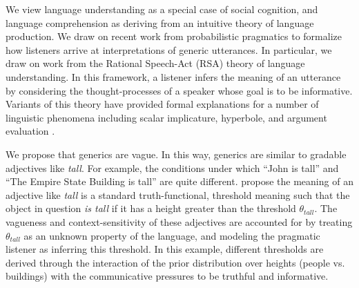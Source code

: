 \documentclass[10pt,letterpaper]{article}
\begin{document}
We view language understanding as a special case of social cognition, and language comprehension as deriving from an intuitive theory of language production.  We draw on recent work from probabilistic pragmatics to formalize how listeners arrive at interpretations of generic utterances. In particular, we draw on work from the Rational Speech-Act (RSA) theory of language understanding. In this framework, a listener infers the meaning of an utterance by considering the thought-processes of a speaker whose goal is to be informative. Variants of this theory have provided formal explanations for a number of linguistic phenomena including scalar implicature, hyperbole, and argument evaluation \cite{Kao2014, Tessler2014, Lassiter2014}. 





We propose that generics are vague. In this way, generics are similar to gradable adjectives like \emph{tall}. For example, the conditions under which ``John is tall'' and ``The Empire State Building is tall'' are quite different.   propose the meaning of an adjective like \emph{tall} is a standard truth-functional, threshold meaning such that the object in question \emph{is tall} if it has a height greater than the threshold $\theta_{tall}$. 
The vagueness and context-sensitivity of these adjectives are accounted for by treating $\theta_{tall}$ as an unknown property of the language, and modeling the pragmatic listener as inferring this threshold. In this example, different thresholds are derived through the interaction of the prior distribution over heights (people vs. buildings) with the communicative pressures to be truthful and informative. 
 
\end{document}
